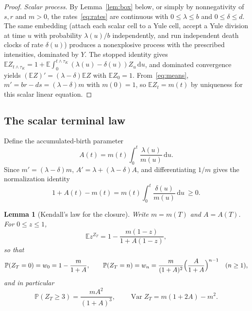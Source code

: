 \documentclass[11pt,a4paper]{article}
\theoremstyle{plain}
\newtheorem{lemma}[theorem]{Lemma}
\theoremstyle{definition}
\theoremstyle{remark}
\newcommand{\PP}{\mathbb P}
\newcommand{\EE}{\mathbb E}
\newcommand{\Var}{\operatorname{Var}}
\newcommand{\dd}{\mathrm d}
\begin{document}
\begin{proof}
\emph{Scalar process.} By Lemma~\ref{lem:box} below, or simply by nonnegativity of $s,r$ and $m>0$, the rates~\eqref{eq:rates} are continuous with $0\le\lambda\le b$ and $0\le\delta\le d$. The same embedding (attach each scalar cell to a Yule cell, accept a Yule division at time $u$ with probability $\lambda(u)/b$ independently, and run independent death clocks of rate $\delta(u)$) produces a nonexplosive process with the prescribed intensities, dominated by $Y$. The stopped identity gives $\EE Z_{t\wedge\tau_K}=1+\EE\int_0^{t\wedge\tau_K}(\lambda(u)-\delta(u))Z_u\,\dd u$, and dominated convergence yields $(\EE Z)'=(\lambda-\delta)\EE Z$ with $\EE Z_0=1$. From~\eqref{eq:means}, $m'=br-ds=(\lambda-\delta)m$ with $m(0)=1$, so $\EE Z_t=m(t)$ by uniqueness for this scalar linear equation.
\end{proof}

\subsection{The scalar terminal law}\label{sec:scalarlaw}
Define the accumulated-birth parameter
\begin{equation}\label{eq:A}
A(t)=m(t)\int_0^t\frac{\lambda(u)}{m(u)}\,\dd u .
\end{equation}
Since $m'=(\lambda-\delta)m$, $A'=\lambda+(\lambda-\delta)A$, and differentiating $1/m$ gives the normalization identity
\begin{equation}\label{eq:positive}
1+A(t)-m(t)=m(t)\int_0^t\frac{\delta(u)}{m(u)}\,\dd u\ \ge0 .
\end{equation}

\begin{lemma}[Kendall's law for the closure]\label{lem:scalar}
Write $m=m(T)$ and $A=A(T)$. For $0\le z\le1$,
\begin{equation}\label{eq:pgf}
\EE z^{Z_T}=1-\frac{m(1-z)}{1+A(1-z)} ,
\end{equation}
so that
\begin{equation}\label{eq:weights}
\PP(Z_T=0)=w_0=1-\frac m{1+A},\qquad \PP(Z_T=n)=w_n=\frac m{(1+A)^2}\Bigl(\frac A{1+A}\Bigr)^{n-1}\quad(n\ge1),
\end{equation}
and in particular
\begin{equation}\label{eq:tailvar}
\PP(Z_T\ge3)=\frac{mA^2}{(1+A)^3},\qquad \Var Z_T=m(1+2A)-m^2 .
\end{equation}
\end{lemma}
\end{document}

